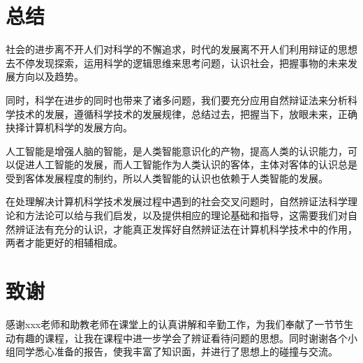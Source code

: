 \documentclass[a4paper,12pt]{report}
\begin{document}
\chapter{总结}
	\begin{spacing}{1.5}
	\songti{}
	社会的进步离不开人们对科学的不懈追求，时代的发展离不开人们利用辩证的思想去不停发现探索，运用科学的逻辑思维来思考问题，认识社会，把握事物的未来发展方向以及趋势。
	
	同时，科学在进步的同时也带来了诸多问题，我们要充分应用自然辩证法来分析科学技术的发展，遵循科学技术的发展规律，总结过去，把握当下，放眼未来，正确抉择计算机科学的发展方向。
	
	人工智能是增强人脑的智能，是人类智能意识化的产物，提高人类的认识能力，可以促进人工智能的发展，而人工智能作为人类认识的客体，主体对客体的认识总是受到客体发展程度的制约，所以人类智能的认识也依赖于人类智能的发展。
	
	在处理解决计算机科学技术发展过程中遇到的社会交叉问题时，自然辨证法科学理论和方法论可以给与我们启发，以及提供相应的理论基础和指导，这需要我们对自然辨证法有充分的认识，才能真正发挥好自然辨证法在计算机科学技术中的作用，两者才能更好的相辅相成。
	\end{spacing}

\chapter{致谢}
	\begin{spacing}{1.5}
	\songti{}
	感谢xxx老师和助教老师在课堂上的认真讲解和辛勤工作，为我们奉献了一节节生动有趣的课程，让我在课程中进一步学会了辨证看待问题的思想。同时谢谢各个小组同学悉心准备的报告，使我丰富了知识面，并进行了思想上的碰撞与交流。
	\end{spacing}





		
\end{document}
